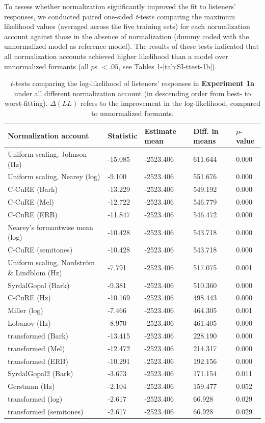 \documentclass[preprint]{JASA}
\begin{document}
To assess whether normalization significantly improved the fit to listeners' responses, we conducted paired one-sided \emph{t}-tests comparing the maximum likelihood values (averaged across the five training sets) for each normalization account against those in the absence of normalization (dummy coded with the unnormalized model as reference model). The results of these tests indicated that all normalization accounts achieved higher likelihood than a model over unnormalized formants (all \(p\)s \(< .05\), see Tables \ref{tab:SI-ttest-1a}-\ref{tab:SI-ttest-1b}).

\begin{table}

\caption{\label{tab:SI-ttest-1a}$t$-tests comparing the log-likelihood of listeners' responses in \textbf{Experiment 1a} under all different normalization account (in descending order from best- to worst-fitting). $\Delta(LL)$ refers to the improvement in the log-likelihood, compared to unnormalized formants.}
\centering
\small
\begin{tabular}{p{6cm}p{2cm}p{3cm}p{3cm}p{2cm}}
\toprule
Normalization account & Statistic & Estimate mean & Diff. in means & $p$-value\\
\midrule
Uniform scaling, Johnson (Hz) & -15.085 & -2523.406 & 611.644 & 0.000\\
Uniform scaling, Nearey (log) & -9.100 & -2523.406 & 551.676 & 0.000\\
C-CuRE (Bark) & -13.229 & -2523.406 & 549.192 & 0.000\\
C-CuRE (Mel) & -12.722 & -2523.406 & 546.779 & 0.000\\
C-CuRE (ERB) & -11.847 & -2523.406 & 546.472 & 0.000\\
Nearey's formantwise mean (log) & -10.428 & -2523.406 & 543.718 & 0.000\\
C-CuRE (semitones) & -10.428 & -2523.406 & 543.718 & 0.000\\
Uniform scaling, Nordström \& Lindblom (Hz) & -7.791 & -2523.406 & 517.075 & 0.001\\
SyrdalGopal (Bark) & -9.381 & -2523.406 & 510.360 & 0.000\\
C-CuRE (Hz) & -10.169 & -2523.406 & 498.443 & 0.000\\
Miller (log) & -7.466 & -2523.406 & 464.305 & 0.001\\
Lobanov (Hz) & -8.970 & -2523.406 & 461.405 & 0.000\\
transformed (Bark) & -13.415 & -2523.406 & 228.190 & 0.000\\
transformed (Mel) & -12.472 & -2523.406 & 214.317 & 0.000\\
transformed (ERB) & -10.291 & -2523.406 & 192.156 & 0.000\\
SyrdalGopal2 (Bark) & -3.673 & -2523.406 & 171.154 & 0.011\\
Gerstman (Hz) & -2.104 & -2523.406 & 159.477 & 0.052\\
transformed (log) & -2.617 & -2523.406 & 66.928 & 0.029\\
transformed (semitones) & -2.617 & -2523.406 & 66.928 & 0.029\\
\bottomrule
\end{tabular}
\end{table}
\end{document}
